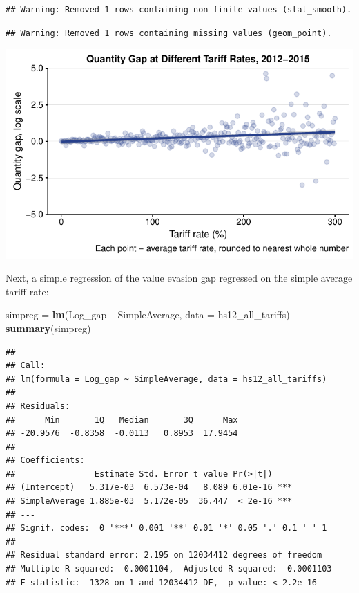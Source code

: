 \documentclass[10pt,]{article}
\newenvironment{Shaded}{\begin{snugshade}}{\end{snugshade}}
\newcommand{\KeywordTok}[1]{\textcolor[rgb]{0.13,0.29,0.53}{\textbf{{#1}}}}
\newcommand{\DataTypeTok}[1]{\textcolor[rgb]{0.13,0.29,0.53}{{#1}}}
\newcommand{\StringTok}[1]{\textcolor[rgb]{0.31,0.60,0.02}{{#1}}}
\newcommand{\NormalTok}[1]{{#1}}
\begin{document}
\begin{verbatim}
## Warning: Removed 1 rows containing non-finite values (stat_smooth).
\end{verbatim}

\begin{verbatim}
## Warning: Removed 1 rows containing missing values (geom_point).
\end{verbatim}

\begin{center}\includegraphics{Figs/tariffVtrade_fig2-1} \end{center}

Next, a simple regression of the value evasion gap regressed on the
simple average tariff rate:

\begin{Shaded}
\begin{Highlighting}[]
\NormalTok{simpreg =}\StringTok{ }\KeywordTok{lm}\NormalTok{(Log_gap ~}\StringTok{ }\NormalTok{SimpleAverage, }\DataTypeTok{data =} \NormalTok{hs12_all_tariffs)}
\KeywordTok{summary}\NormalTok{(simpreg)}
\end{Highlighting}
\end{Shaded}

\begin{verbatim}
## 
## Call:
## lm(formula = Log_gap ~ SimpleAverage, data = hs12_all_tariffs)
## 
## Residuals:
##      Min       1Q   Median       3Q      Max 
## -20.9576  -0.8358  -0.0113   0.8953  17.9454 
## 
## Coefficients:
##                Estimate Std. Error t value Pr(>|t|)    
## (Intercept)   5.317e-03  6.573e-04   8.089 6.01e-16 ***
## SimpleAverage 1.885e-03  5.172e-05  36.447  < 2e-16 ***
## ---
## Signif. codes:  0 '***' 0.001 '**' 0.01 '*' 0.05 '.' 0.1 ' ' 1
## 
## Residual standard error: 2.195 on 12034412 degrees of freedom
## Multiple R-squared:  0.0001104,  Adjusted R-squared:  0.0001103 
## F-statistic:  1328 on 1 and 12034412 DF,  p-value: < 2.2e-16
\end{verbatim}
\end{document}
